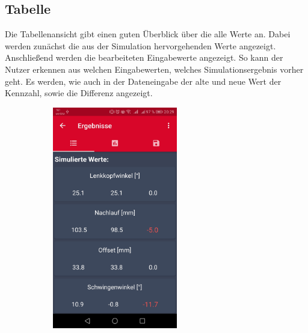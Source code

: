 		
		\subsection{Tabelle}
		\label{subsec:table}
		Die Tabellenansicht gibt einen guten Überblick über die alle Werte an. Dabei werden zunächst die aus der Simulation hervorgehenden Werte angezeigt. Anschließend werden die bearbeiteten Eingabewerte angezeigt. So kann der Nutzer erkennen aus welchen Eingabewerten, welches Simulationsergebnis vorher geht. Es werden, wie auch in der Dateneingabe der alte und neue Wert der Kennzahl, sowie die Differenz angezeigt.
		
	\begin{figure}[H]
	\begin{subfigure}[b]{0.5\textwidth}
		\centering
		\includegraphics[width=0.6\textwidth]{../include/images/funktionalitaet/simval}
	\end{subfigure}
	\hfill
	\begin{subfigure}[b]{0.5\textwidth}
	\centering

\end{subfigure}
\end{figure}

